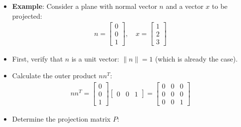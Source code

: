 \begin{frame}{}
    \begin{itemize}
        \item \textbf{Example}: Consider a plane with normal vector $n$ and a vector $x$ to be projected:
        \begin{align*}
            n = \begin{bmatrix}
                0\\0\\1
            \end{bmatrix}, \quad x = \begin{bmatrix}
                1\\2\\3
            \end{bmatrix}
        \end{align*}
        \item First, verify that $n$ is a unit vector: $\|n\| = 1$ (which is already the case).
        \item Calculate the outer product $nn^T$: 
        \begin{align*}
            nn^T = 
                \begin{bmatrix}
                0\\0\\1
            \end{bmatrix}\begin{bmatrix}0 & 0 & 1\end{bmatrix} = \begin{bmatrix}
                0 & 0 & 0\\
                0 & 0 & 0\\
                0 & 0 & 1
            \end{bmatrix}
        \end{align*}
        \item Determine the projection matrix $P$:
    \end{itemize}
\end{frame}




